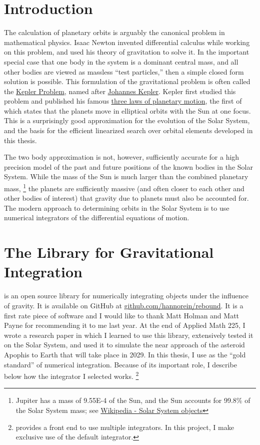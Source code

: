 \section{Introduction}
\label{section_intro}
The calculation of planetary orbits is arguably the canonical problem in mathematical physics.
Isaac Newton invented differential calculus while working on this problem, and used his theory of gravitation to solve it.
In the important special case that one body in the system is a dominant central mass,
and all other bodies are viewed as massless ``test particles,'' then a simple closed form solution is possible.
This formulation of the gravitational problem is often called the \href{https://en.wikipedia.org/wiki/Kepler_problem}{Kepler Problem},
named after \href{https://en.wikipedia.org/wiki/Johannes_Kepler}{Johannes Kepler}.
Kepler first studied this problem and published his famous \href{https://en.wikipedia.org/wiki/Kepler\%27s_laws_of_planetary_motion}{three laws of planetary motion},
the first of which states that the planets move in elliptical orbits with the Sun at one focus.
This is a surprisingly good approximation for the evolution of the Solar System, and the basis for the efficient linearized search over orbital elements developed in this thesis.

The two body approximation is not, however, sufficiently accurate for a high precision model of the past and future positions of the known bodies in the Solar System.
While the mass of the Sun is much larger than the combined planetary mass, 
\footnote{Jupiter has a mass of 9.55E-4 of the Sun, and the Sun accounts for 99.8\% of the Solar System mass;
see \href{https://en.wikipedia.org/wiki/List_of_Solar_System_objects_by_size}{Wikipedia - Solar System objects}}
the planets are sufficiently massive (and often closer to each other and other bodies of interest) 
that gravity due to planets must also be accounted for.
The modern approach to determining orbits in the Solar System is to use numerical integrators of the differential equations of motion.

\section{The  Library for Gravitational Integration}
\label{section_rebound}
 is an open source library for numerically integrating objects under the influence of gravity.
It is available on GitHub at \href{https://github.com/hannorein/rebound}{github.com/hannorein/rebound}.
It is a first rate piece of software and I would like to thank Matt Holman and Matt Payne for recommending it to me last year.
At the end of Applied Math 225, I wrote a research paper in which I learned to use this library, 
extensively tested it on the Solar System, and used it to simulate the near approach of the asteroid Apophis to Earth that will take place in 2029.
In this thesis, I use  as the ``gold standard'' of numerical integration.
Because of its important role, I describe below how the  integrator I selected works.
\footnote{ provides a front end to use multiple integrators. In this project, I make exclusive use of the default  integrator.}

